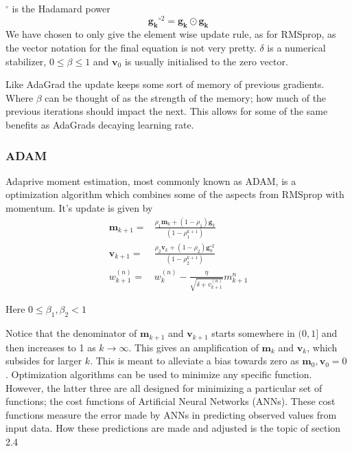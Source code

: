 \documentclass{article}
\theoremstyle{definition}
\begin{document}
 $^{\circ}$ is the Hadamard power
 \[
 \mathbf{g_k}^{\circ 2} = \mathbf{g_k} \odot \mathbf{g_k}  
 \]
 We have chosen to only give the element wise update rule, as for RMSprop, as the vector notation for the final equation is not very pretty. $\delta$ is a numerical stabilizer, $0\leq \beta \leq 1$ and $\mathbf{v}_0$ is usually initialised to the zero vector.
\par
\vspace{1mm}
Like AdaGrad the update keeps some sort of memory of previous gradients. Where $\beta$ can be thought of as the strength of the memory; how much of the previous iterations should impact the next. This allows for some of the same benefits as AdaGrads decaying learning rate.

\subsubsection{ADAM}
Adaprive moment estimation, most commonly known as ADAM, is a optimization algorithm which combines some of the aspects from RMSprop with momentum. It's update is given by
\begin{align*}
    \mathbf{m}_{k+1} =& \frac{\rho_1 \mathbf{m}_k + (1- \rho_1) \mathbf{g}_k}{\left(1 - \rho_1^{k+1}\right)}\\
    \mathbf{v}_{k+1} =& \frac{\rho_2 \mathbf{v}_k + (1-\rho_2) \mathbf{g}_k^{\circ 2}}{\left(1-\rho_2^{k+1}\right)}\\
    w_{k+1}^{(n)} =& w_k^{(n)} - \frac{\eta}{ \sqrt{\delta+v_{k+1}^{(n)}}} m_{k+1}^{n}
\end{align*}

Here $0 \leq \beta_1,\beta_2 < 1$ 
\par
\vspace{1mm}
Notice that the denominator of $\mathbf{m}_{k+1}$ and $\mathbf{v}_{k+1}$ starts somewhere in $(0,1]$ and then increases to 1 as $k \to \infty$. This gives an amplification of $\mathbf{m}_k$ and $\mathbf{v}_k$, which subsides for larger $k$. This is meant to alleviate a bias towards zero as  $\mathbf{m}_0, \mathbf{v}_0 = 0$ \parencite[Section 3]{kingma2014adam}
\label{AdamAmp}.
Optimization algorithms can be used to minimize any specific function. However, the latter three are all designed for minimizing a particular set of functions; the cost functions of Artificial Neural Networks (ANNs). These cost functions measure the error made by ANNs in predicting observed values from input data. How these predictions are made and adjusted is the topic of section 2.4
\end{document}
